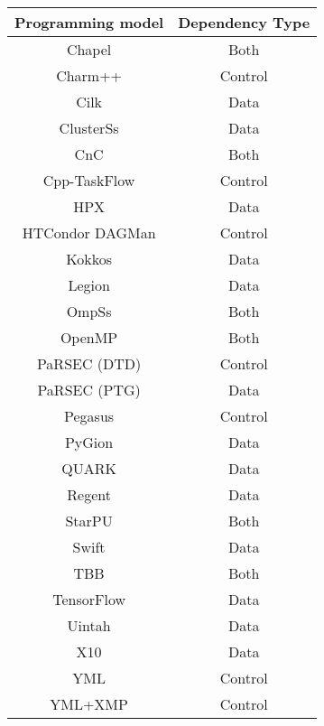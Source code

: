 \begin{tabular}{cc}
\hline
Programming model & Dependency Type \\
\hline
Chapel & Both\\
Charm++ & Control\\
Cilk & Data\\
ClusterSs & Data\\
CnC & Both\\
Cpp-TaskFlow & Control\\
HPX & Data\\
HTCondor DAGMan & Control\\
Kokkos & Data\\
Legion & Data\\
OmpSs & Both\\
OpenMP & Both\\
PaRSEC (DTD) & Control\\
PaRSEC (PTG) & Data\\
Pegasus & Control\\
PyGion & Data\\
QUARK & Data\\
Regent & Data\\
StarPU & Both\\
Swift & Data\\
TBB & Both\\
TensorFlow & Data\\
Uintah & Data\\
X10 & Data\\
YML & Control\\
YML+XMP & Control\\
\hline
\end{tabular}
